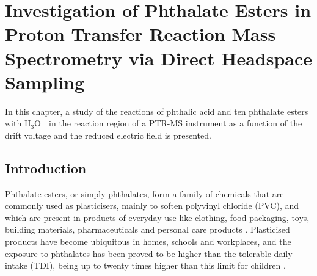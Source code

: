 \chapter{Investigation of Phthalate Esters in Proton Transfer Reaction Mass Spectrometry via Direct Headspace Sampling}








In this chapter, a study of the reactions of phthalic acid and ten phthalate esters with H$_3$O$^+$ in the reaction region of a PTR-MS instrument as a function of the drift voltage and the reduced electric field is presented.


\section{Introduction}

Phthalate esters, or simply phthalates, form a family of chemicals that are commonly used as plasticisers, mainly to soften polyvinyl chloride (PVC), and which are present in products of everyday use like clothing, food packaging, toys, building materials, pharmaceuticals and personal care products \cite{graham1973phthalate,cao2010phthalate,schettler2006human}.  
%
%
Plasticised products have become ubiquitous in  homes, schools and workplaces, and the exposure to phthalates has been proved to be higher than the tolerable daily intake (\acrshort{TDI}), being up to twenty times higher than this limit for children 
\cite{heudorf2007phthalates}.
%








